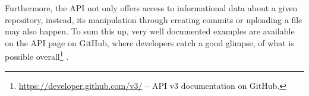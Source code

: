 Furthermore, the API not only offers access to informational data about a given repository, instead, its manipulation through creating commits or uploading a file may also happen. To sum this up, very well documented examples are available on the API page on GitHub, where developers catch a good glimpse, of what is possible overall\footnote{\url{https://developer.github.com/v3/} -- API v3 documentation on GitHub.} \cite[401]{loeliger2012version}.

